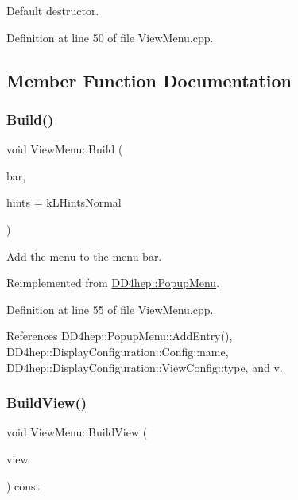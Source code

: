 Default destructor. 



Definition at line 50 of file View\+Menu.\+cpp.



\subsection{Member Function Documentation}
\hypertarget{class_d_d4hep_1_1_view_menu_abd9d63ee3f3ca7b16a646b29e41a855c}{}\label{class_d_d4hep_1_1_view_menu_abd9d63ee3f3ca7b16a646b29e41a855c} 
\subsubsection{\texorpdfstring{Build()}{Build()}}
{\footnotesize\ttfamily void View\+Menu\+::\+Build (\begin{DoxyParamCaption}\item[{T\+G\+Menu\+Bar $\ast$}]{bar,  }\item[{int}]{hints = {\ttfamily kLHintsNormal} }\end{DoxyParamCaption})\hspace{0.3cm}{\ttfamily [virtual]}}



Add the menu to the menu bar. 



Reimplemented from \hyperlink{class_d_d4hep_1_1_popup_menu_a896a1626d79fd3d6ccb1c1e0657cf1ae}{D\+D4hep\+::\+Popup\+Menu}.



Definition at line 55 of file View\+Menu.\+cpp.



References D\+D4hep\+::\+Popup\+Menu\+::\+Add\+Entry(), D\+D4hep\+::\+Display\+Configuration\+::\+Config\+::name, D\+D4hep\+::\+Display\+Configuration\+::\+View\+Config\+::type, and v.

\hypertarget{class_d_d4hep_1_1_view_menu_aa100d19de078bae80eb9a434f2e2170b}{}\label{class_d_d4hep_1_1_view_menu_aa100d19de078bae80eb9a434f2e2170b} 
\subsubsection{\texorpdfstring{Build\+View()}{BuildView()}}
{\footnotesize\ttfamily void View\+Menu\+::\+Build\+View (\begin{DoxyParamCaption}\item[{\hyperlink{class_d_d4hep_1_1_view}{View} $\ast$}]{view }\end{DoxyParamCaption}) const}



